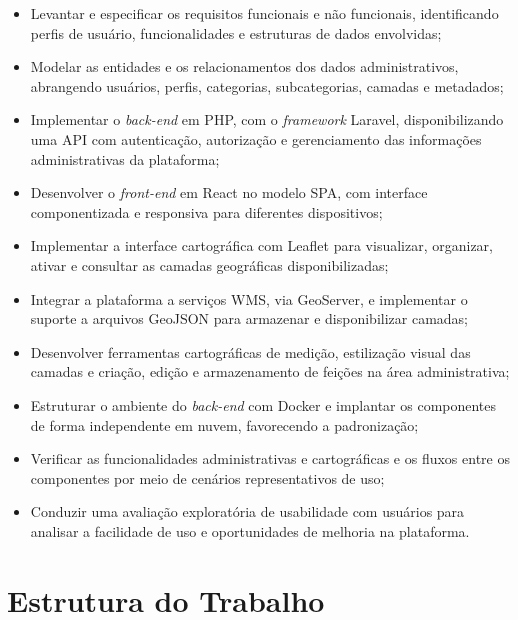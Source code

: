 \begin{itemize}

    \item Levantar e especificar os requisitos funcionais e não funcionais, identificando perfis de usuário, funcionalidades e estruturas de dados envolvidas;

    \item Modelar as entidades e os relacionamentos dos dados administrativos, abrangendo usuários, perfis, categorias, subcategorias, camadas e metadados;

    \item Implementar o \textit{back-end} em PHP, com o \textit{framework} Laravel, disponibilizando uma \gls{API} com autenticação, autorização e gerenciamento das informações administrativas da plataforma;

    \item Desenvolver o \textit{front-end} em React no modelo \gls{SPA}, com interface componentizada e responsiva para diferentes dispositivos;

    \item Implementar a interface cartográfica com Leaflet para visualizar, organizar, ativar e consultar as camadas geográficas disponibilizadas;

    \item Integrar a plataforma a serviços \gls{WMS}, via GeoServer, e implementar o suporte a arquivos GeoJSON para armazenar e disponibilizar camadas;

    \item Desenvolver ferramentas cartográficas de medição, estilização visual das camadas e criação, edição e armazenamento de feições na área administrativa;

    \item Estruturar o ambiente do \textit{back-end} com Docker e implantar os componentes de forma independente em nuvem, favorecendo a padronização;

    \item Verificar as funcionalidades administrativas e cartográficas e os fluxos entre os componentes por meio de cenários representativos de uso;

    \item Conduzir uma avaliação exploratória de usabilidade com usuários para analisar a facilidade de uso e oportunidades de melhoria na plataforma.
\end{itemize}

\section{Estrutura do Trabalho}
\label{sec:estrutura-do-trabalho}

